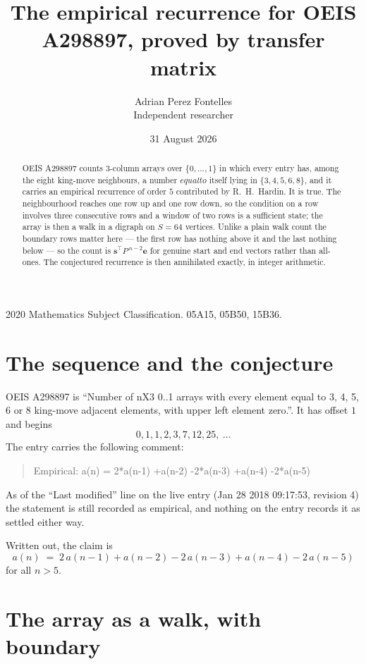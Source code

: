 \documentclass[11pt,a4paper]{article}
\title{The empirical recurrence for OEIS A298897, proved by transfer matrix}
\author{Adrian Perez Fontelles\\ \small Independent researcher}
\date{31 August 2026}
\theoremstyle{plain}
\theoremstyle{definition}
\begin{document}
\maketitle

\begin{abstract}
OEIS A298897 counts $3$-column arrays over $\{0,\dots,1\}$ in which every entry has,
among the eight king-move neighbours, a number $equal to$ itself lying in $\{3,4,5,6,8\}$, and it carries an empirical
recurrence of order $5$ contributed by R.~H.~Hardin. It is true. The neighbourhood
reaches one row up and one row down, so the condition on a row involves three consecutive
rows and a window of two rows is a sufficient state; the array is then a walk in a digraph
on $S=64$ vertices. Unlike a plain walk count the boundary rows matter here --- the first
row has nothing above it and the last nothing below --- so the count is
$\mathbf{s}^{\!\top}P^{\,n-2}\mathbf{e}$ for genuine start and end vectors rather than
all-ones. The conjectured recurrence is then annihilated exactly, in integer arithmetic.
\end{abstract}

\noindent\small 2020 Mathematics Subject Classification. 05A15, 05B50, 15B36.\normalsize

\section{The sequence and the conjecture}

OEIS A298897 is ``Number of nX3 0..1 arrays with every element equal to 3, 4, 5, 6 or 8 king-move adjacent elements, with upper left element zero.''. It has offset
$1$ and begins
\[
0, 1, 1, 2, 3, 7, 12, 25,\ \dots
\]
The entry carries the following comment:
\begin{quote}\small
Empirical: a(n) = 2*a(n-1) +a(n-2) -2*a(n-3) +a(n-4) -2*a(n-5)
\end{quote}
As of the ``Last modified'' line on the live entry (Jan 28 2018 09:17:53, revision
4) the statement is still recorded as empirical, and nothing on the entry
records it as settled either way.

Written out, the claim is
\begin{equation}\label{eq:conj}
a(n)\;=\;2\,a(n-1) + a(n-2) - 2\,a(n-3) + a(n-4) - 2\,a(n-5)
\end{equation}
for all $n>5$.

\section{The array as a walk, with boundary}
\end{document}
